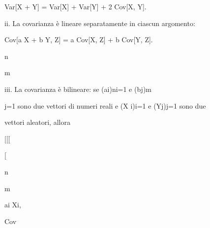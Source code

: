 \documentclass[a4paper,portrait,12pt]{article}
\begin{document}
\begin{flushleft}
Var[X + Y] = Var[X] + Var[Y] + 2 Cov[X, Y].
\end{flushleft}


\begin{flushleft}
ii. La covarianza \`{e} lineare separatamente in ciascun argomento:
\end{flushleft}


\begin{flushleft}
Cov[a X + b Y, Z] = a Cov[X, Z] + b Cov[Y, Z].
\end{flushleft}


\begin{flushleft}
n
\end{flushleft}


\begin{flushleft}
m
\end{flushleft}


\begin{flushleft}
iii. La covarianza \`{e} bilineare: se (ai)ni=1 e (bj)m
\end{flushleft}


\begin{flushleft}
j=1 sono due vettori di numeri reali e (X i)i=1 e (Yj)j=1 sono due
\end{flushleft}


\begin{flushleft}
vettori aleatori, allora
\end{flushleft}





[[[


[





\begin{flushleft}
n
\end{flushleft}





\begin{flushleft}
m
\end{flushleft}





\begin{flushleft}
ai Xi,
\end{flushleft}





\begin{flushleft}
Cov
\end{flushleft}
\end{document}
